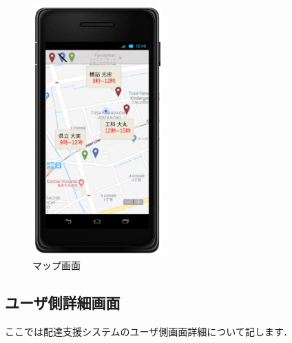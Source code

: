 \documentclass[a4j,titlepage]{jarticle}
\begin{document}
\begin{figure}[htbp]
 \begin{center}
  \includegraphics[width=50mm]{map.pdf}
	\caption{マップ画面}
	\label{fig:map}
 \end{center}

\end{figure}

\newpage

\subsection{ユーザ側詳細画面}
ここでは配達支援システムのユーザ側画面詳細について記します．
\end{document}
